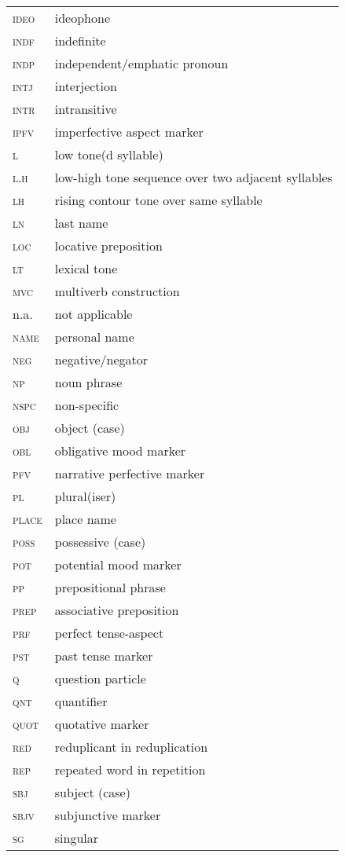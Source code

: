  \begin{tabularx}{.45\textwidth}{lQ}
 \textsc{ideo} & ideophone \\
 \textsc{indf} & indefinite \\
 \textsc{indp} & independent/emphatic pronoun \\
 \textsc{intj} & interjection \\
 \textsc{intr} & intransitive \\
\textsc{ipfv} & imperfective aspect marker \\
 \textsc{l} & low tone(d syllable) \\
 \textsc{l.h} & low-high tone sequence over two adjacent syllables \\
\textsc{lh} & rising contour tone over same syllable\\
\textsc{ln} & last name\\
\textsc{loc} & locative preposition\\
\textsc{lt} & lexical tone\\
\textsc{mvc} & multiverb construction\\
n.a. & not applicable\\
\textsc{name} & personal name\\
\textsc{neg} & negative/negator\\{}
\textsc{np} & noun phrase\\
\textsc{nspc} & non-specific\\
\textsc{obj} & object (case)\\
\textsc{obl} & obligative mood marker\\{}
\textsc{pfv} & narrative perfective marker\\
\textsc{pl} & plural(iser)\\
\textsc{place} & place name\\
\textsc{poss} & possessive (case)\\
\textsc{pot} & potential mood marker\\
\textsc{pp} & prepositional phrase\\
\textsc{prep} & associative preposition\\
\textsc{prf} & perfect tense-aspect\\
\textsc{pst} & past tense marker\\
\textsc{q} & question particle\\
\textsc{qnt} & quantifier\\
\textsc{quot} & quotative marker\\
\textsc{red} & reduplicant in reduplication\\
\textsc{rep} & repeated word in repetition\\
\textsc{sbj} & subject (case)\\
\textsc{sbjv} & subjunctive marker\\
\textsc{sg} & singular\\
\end{tabularx}
